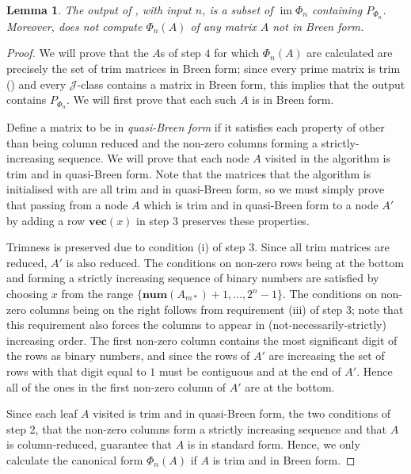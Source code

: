 \documentclass[11pt]{article}
\newtheorem{lemma}[thm]{Lemma}
\numberwithin{equation}{section}
\DeclareMathOperator{\im}{im}
\newcommand{\num}{\mathbf{num}}
\newcommand{\vect}{\mathbf{vec}}
\newcommand{\J}{\mathscr{J}}
\begin{document}
\begin{lemma}
  The output of , with input $n$, is a subset of
  $\im\Phi_n$ containing $P_{\Phi_n}$. Moreover, 
  does not compute $\Phi_n(A)$ of any matrix $A$ not in Breen form.
\end{lemma} 
\begin{proof}
  We will prove that the $A$s of step $4$ for which $\Phi_n(A)$ are calculated
  are precisely the set of trim matrices in Breen form; since every prime
  matrix is trim () and every $\J$-class
  contains a matrix in Breen form, this implies that the output contains
  $P_{\Phi_n}$. We will first prove that each such $A$ is in Breen form.

  Define a matrix to be in \emph{quasi-Breen form} if it satisfies each
  property of  other than being column reduced and the
  non-zero columns forming a strictly-increasing sequence.
  We will prove that each node $A$ visited in the algorithm is trim and in
  quasi-Breen form. Note that the matrices that the algorithm is initialised
  with are all trim and in quasi-Breen form, so we must simply prove that
  passing from a node $A$ which is trim and in quasi-Breen form to a node
  $A'$ by adding a row $\vect(x)$ in step $3$ preserves these properties.

  Trimness is preserved due to condition (i) of step $3$. Since all trim
  matrices are reduced, $A'$ is also reduced. The conditions on non-zero rows
  being at the bottom and forming a strictly increasing sequence of binary
  numbers are satisfied by choosing $x$ from the range $\{\num(A_{m*}) + 1,
    \ldots, 2^n - 1\}$.  The conditions on non-zero columns being on the right
  follows from requirement (iii) of step $3$; note that this requirement also
  forces the columns to appear in (not-necessarily-strictly) increasing order.
  The first non-zero column contains the most significant digit of the rows as
  binary numbers, and since the rows of $A'$ are increasing the set of rows with
  that digit equal to $1$ must be contiguous and at the end of $A'$. Hence all
  of the ones in the first non-zero column of $A'$ are at the bottom.

  Since each leaf $A$ visited is trim and in quasi-Breen form, the two
  conditions of step 2, that the non-zero columns form a strictly increasing
  sequence and that $A$ is column-reduced, guarantee that $A$ is in standard
  form. Hence, we only calculate the canonical form $\Phi_n(A)$ if $A$ is trim
  and in Breen form.


\end{proof}
\end{document}
